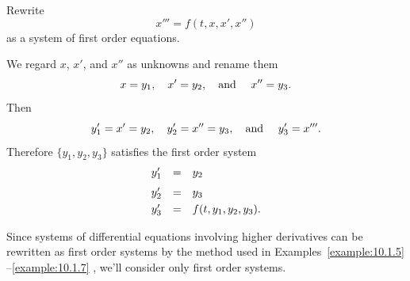 \begin{example}
  \label{example:10.1.7} \rm Rewrite
  \[
    x'''=f(t,x,x',x'')
  \]
  as a system of first order equations.
\end{example}

\begin{examplesolution}
\solution We regard $x$, $x'$, and $x''$ as unknowns and rename them
\[
  x=y_{1},\quad x'=y_{2},\mbox{\quad and \quad}x''=y_{3}.
\]
Then
\[
  y_{1}'=x'=y_{2},\quad y_{2}'=x''=y_{3},\mbox{\quad and \quad}y_{3}'=x'''.
\]
Therefore $\{y_{1},y_{2},y_{3}\}$ satisfies the first order system
\[
  \begin{array}{ccl}
    y_{1}' & = & y_{2}                   \\[2\jot]
    y_{2}' & = & y_{3}                   \\[1\jot]
    y_{3}' & = & f(t,y_{1},y_{2},y_{3}).
  \end{array}
\]
\end{examplesolution}

Since systems of differential equations involving higher derivatives can be rewritten as first order
systems by the method used in Examples~\ref{example:10.1.5} --\ref{example:10.1.7} , we'll consider
only first order systems.


